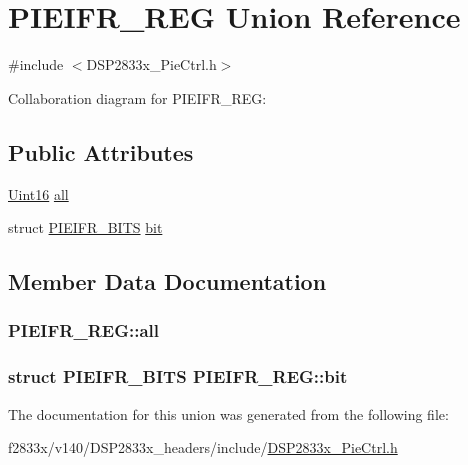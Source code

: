 \hypertarget{union_p_i_e_i_f_r___r_e_g}{}\section{P\+I\+E\+I\+F\+R\+\_\+\+R\+E\+G Union Reference}
\label{union_p_i_e_i_f_r___r_e_g}


{\ttfamily \#include $<$D\+S\+P2833x\+\_\+\+Pie\+Ctrl.\+h$>$}



Collaboration diagram for P\+I\+E\+I\+F\+R\+\_\+\+R\+E\+G\+:
\subsection*{Public Attributes}
\begin{DoxyCompactItemize}
\item 
\hyperlink{_d_s_p2833x___device_8h_a59a9f6be4562c327cbfb4f7e8e18f08b}{Uint16} \hyperlink{union_p_i_e_i_f_r___r_e_g_a28634b60b793bb947b6f9faf7e6e9dca}{all}
\item 
struct \hyperlink{struct_p_i_e_i_f_r___b_i_t_s}{P\+I\+E\+I\+F\+R\+\_\+\+B\+I\+T\+S} \hyperlink{union_p_i_e_i_f_r___r_e_g_a06cd7aa91321b23e58ebd6a0174c2389}{bit}
\end{DoxyCompactItemize}


\subsection{Member Data Documentation}
\hypertarget{union_p_i_e_i_f_r___r_e_g_a28634b60b793bb947b6f9faf7e6e9dca}{}
\subsubsection[{all}]{ P\+I\+E\+I\+F\+R\+\_\+\+R\+E\+G\+::all}\label{union_p_i_e_i_f_r___r_e_g_a28634b60b793bb947b6f9faf7e6e9dca}
\hypertarget{union_p_i_e_i_f_r___r_e_g_a06cd7aa91321b23e58ebd6a0174c2389}{}
\subsubsection[{bit}]{\setlength{\rightskip}{0pt plus 5cm}struct {\bf P\+I\+E\+I\+F\+R\+\_\+\+B\+I\+T\+S} P\+I\+E\+I\+F\+R\+\_\+\+R\+E\+G\+::bit}\label{union_p_i_e_i_f_r___r_e_g_a06cd7aa91321b23e58ebd6a0174c2389}


The documentation for this union was generated from the following file\+:\begin{DoxyCompactItemize}
\item 
f2833x/v140/\+D\+S\+P2833x\+\_\+headers/include/\hyperlink{_d_s_p2833x___pie_ctrl_8h}{D\+S\+P2833x\+\_\+\+Pie\+Ctrl.\+h}\end{DoxyCompactItemize}
